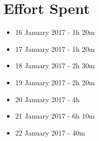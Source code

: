 \section{Effort Spent}

\begin{itemize}
	\item 16 January 2017 - 1h 20m
	\item 17 January 2017 - 1h 20m
	\item 18 January 2017 - 2h 30m
	\item 19 January 2017 - 2h 20m
	\item 20 January 2017 - 4h
	\item 21 January 2017 - 6h 10m
	\item 22 January 2017 - 40m
\end{itemize}
